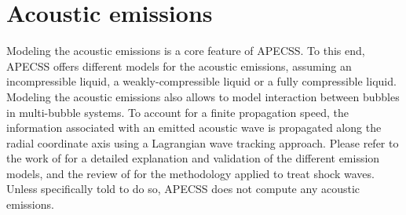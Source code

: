 \chapter{Acoustic emissions}

Modeling the acoustic emissions is a core feature of APECSS. To this end, APECSS offers different models for the acoustic emissions, assuming an incompressible liquid, a weakly-compressible liquid or a fully compressible liquid. Modeling the acoustic emissions also allows to model interaction between bubbles in multi-bubble systems. To account for a finite propagation speed, the information associated with an emitted acoustic wave is propagated along the radial coordinate axis using a Lagrangian wave tracking approach. Please refer to the work of \citet{Denner2023} for a detailed explanation and validation of the different emission models, and the review of \citet{Denner2024a} for the methodology applied to treat shock waves. Unless specifically told to do so, APECSS does not compute any acoustic emissions. 

\vspace{0.8em}

